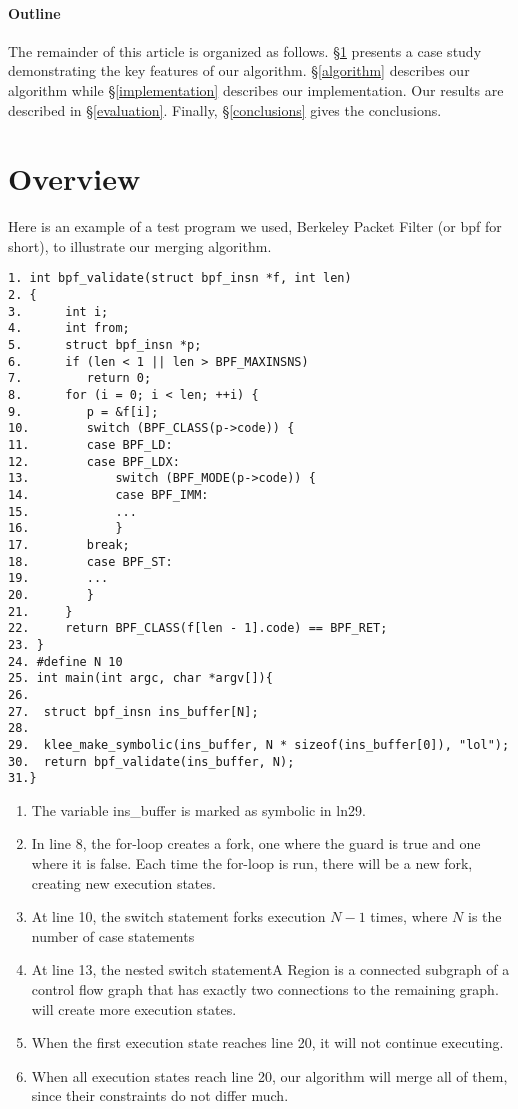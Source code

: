 \documentclass[12pt,a4paper]{article}
\begin{document}
\paragraph{Outline}

The remainder of this article is organized as follows. \S\ref{overview} presents a case study demonstrating the key features of our algorithm. \S\ref{algorithm} describes our algorithm while \S\ref{implementation} describes our implementation. Our results are described in \S\ref{evaluation}. Finally, \S\ref{conclusions} gives the conclusions.

\section{Overview}\label{overview}
Here is an example of a test program we used, Berkeley Packet Filter (or bpf for short), to illustrate our merging algorithm.

\begin{verbatim}
1. int bpf_validate(struct bpf_insn *f, int len)
2. {
3.      int i;
4.      int from;
5.      struct bpf_insn *p;
6.      if (len < 1 || len > BPF_MAXINSNS)
7.         return 0;
8.      for (i = 0; i < len; ++i) {
9.         p = &f[i];
10.        switch (BPF_CLASS(p->code)) {
11.        case BPF_LD:
12.        case BPF_LDX:
13.            switch (BPF_MODE(p->code)) {
14.            case BPF_IMM:
15.            ...
16.            }
17.        break;
18.        case BPF_ST:
19.        ...
20.        }
21.     }
22.     return BPF_CLASS(f[len - 1].code) == BPF_RET;
23. }
24. #define N 10 
25. int main(int argc, char *argv[]){  
26.
27.  struct bpf_insn ins_buffer[N];
28.
29.  klee_make_symbolic(ins_buffer, N * sizeof(ins_buffer[0]), "lol");
30.  return bpf_validate(ins_buffer, N);
31.}
\end{verbatim}

\begin{enumerate}
\item The variable ins\_buffer is marked as symbolic in ln29. 
\item In line 8, the for-loop creates a fork, one where the guard is true and one where it is false. Each time the for-loop is run, there will be a new fork, creating new execution states. 
\item At line 10, the switch statement forks execution $N-1$ times, where $N$ is the number of case statements
\item At line 13, the nested switch statementA Region is a connected subgraph of a control flow graph that has exactly two connections to the remaining graph. will create more execution states. 
\item When the first execution state reaches line 20, it will not continue executing.
\item When all execution states reach line 20, our algorithm will merge all of them, since their constraints do not differ much.
\end{enumerate}
\end{document}
